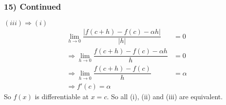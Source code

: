 \documentclass[handout]{beamer}
\begin{document}
\begin{frame}
    \frametitle{15) Continued}
    $(iii) \Rightarrow (i)$
    \begin{align*}
    \underset{h \to 0}{\lim}\dfrac{|f(c+h)-f(c)-\alpha h|}{|h|}&=0\\
    \Rightarrow \underset{h \to 0}{\lim}\dfrac{f(c+h)-f(c)-\alpha h}{h}&=0\\
    \Rightarrow \underset{h \to 0}{\lim}\dfrac{f(c+h)-f(c)}{h}&=\alpha\\
    \Rightarrow f'(c)=\alpha
    \end{align*}
    So $f(x)$ is differentiable at $x=c$.
    So all (i), (ii) and (iii) are equivalent.
    \end{frame}





\end{document}
